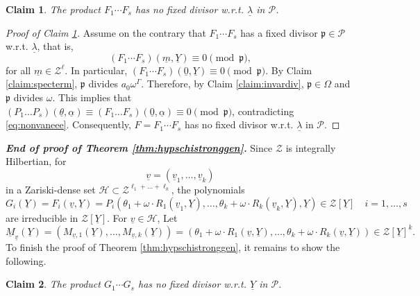 \documentclass[11pt,a4paper,reqno]{amsart}
\newtheorem{claim}{Claim}
\theoremstyle{definition}
\begin{document}
\begin{claim}\label{claim:nofixprdivgenca}
The product $F_1\cdots F_s$ has no fixed divisor \hbox{w.r.t.} $\underline{\lambda}$ in $\mathcal{P}$.
\end{claim}
\begin{proof}[Proof of Claim \ref{claim:nofixprdivgenca}]
Assume on the contrary that $F_1 \cdots F_s$ has a fixed divisor $\mathfrak{p}\in \mathcal{P}$ \hbox{w.r.t.} $\underline{\lambda}$, that is, $$
(F_1\cdots F_s)(\underline{m},\underline{Y})\equiv 0 \pmod{\mathfrak{p}},
$$
for all $\underline{m} \in \mathcal{Z}^{\ell}$. In particular, $(F_1 \cdots F_s)(\underline{0},\underline{Y}) \equiv 0 \pmod{\mathfrak{p}}$. By Claim \ref{claim:specterm}, $\mathfrak{p}$ divides $a_0 \omega^\Gamma$. Therefore, by Claim \ref{claim:invardiv}, $\mathfrak{p} \in \Omega$ and $\mathfrak{p}$ divides $\omega$. This implies that $(P_1\dots P_s)(\underline{\theta},\underline{\alpha}) \equiv (F_1\dots F_s)(\underline{0},\underline{\alpha}) \equiv 0 \pmod{\mathfrak{p}}$, contradicting \eqref{eq:nonvaneee}. Consequently, $F=F_1 \cdots F_s$ has no fixed divisor \hbox{w.r.t.} $\underline{\lambda}$ in $\mathcal{P}$.
\end{proof}
\vskip 1mm
\noindent
\emph{\textbf{End of proof of Theorem \ref{thm:hypschistronggen}.}}
Since $\mathcal{Z}$ is integrally Hilbertian, for 
$$\underline{v}=(\underline{v}_1,\dots,\underline{v}_k) 
$$ in a Zariski-dense set $\mathcal{H} \subset  \mathcal{Z}^{\ell_1+\dots+\ell_k}$, the polynomials
$$
G_i(\underline{Y})=F_i(\underline{v},\underline{Y})=P_i(\theta_1+\omega \cdot R_1(\underline{v}_1,\underline{Y}),\dots, \theta_k+\omega \cdot R_k(\underline{v}_k,\underline{Y}),\underline{Y}) \in \mathcal{Z}[\underline{Y}]\quad i=1,\dots,s
$$ are irreducible in $\mathcal{Z}[\underline{Y}]$. For $\underline{v} \in \mathcal{H}$, Let 
$$
\underline{M}_{\underline{v}}(\underline{Y})=(M_{\underline v, 1}(\underline{Y}),\dots,M_{\underline v,k}(\underline{Y}))=(\theta_1+\omega \cdot R_1(\underline{v},\underline{Y}),\dots,\theta_k+\omega \cdot R_k(\underline{v},\underline{Y})) \in \mathcal{Z}[\underline{Y}]^k.
$$ To finish the proof of Theorem \ref{thm:hypschistronggen}, it remains to show the following.
\begin{claim}\label{claim:nothavifd}
The product $G_1\cdots G_s$ has no fixed divisor \hbox{w.r.t.} $\underline{Y}$ in $\mathcal{P}$.
\end{claim}
\end{document}
